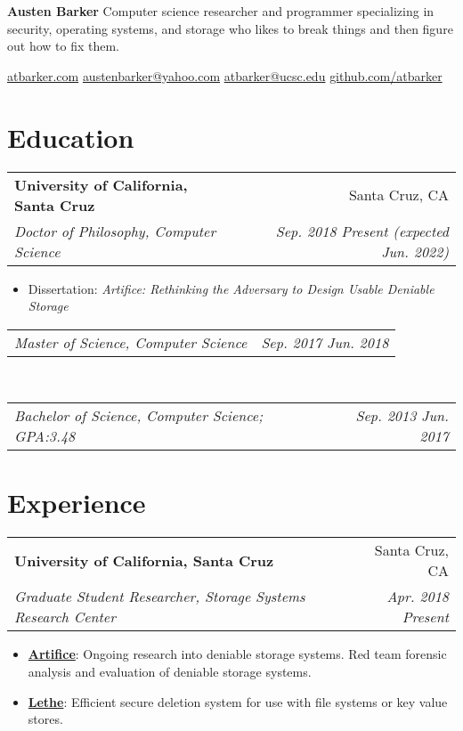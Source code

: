 \documentclass[letterpaper,10pt,oneside]{memoir}
\makeatletter
\newcommand{\resumeItem}[2]{
  \item\small{
    \textbf{#1}{: #2}
  }
}
\newcommand{\resumeSubheading}[4]{
  \vspace{1pt}%
    \begin{tabular*}{0.99\textwidth}[t]{l@{\extracolsep{\fill}}r}
      \textbf{#1} & #2 \\
      \textit{\small #3} & \textit{\small #4} \\
    \end{tabular*}
}
\newcommand{\resumeSubheadingContinue}[2]{
  \vspace{-1pt}
    \begin{tabular*}{0.99\textwidth}[t]{l@{\extracolsep{\fill}}r}
      \textit{\small #1} & \textit{\small #2} \\
    \end{tabular*}
}
\newcommand{\resumeSubHeadingListStart}{\vspace{1pt}\begin{itemize}[noitemsep,nolistsep,leftmargin=*,label={}]}
\newcommand{\resumeSubHeadingListEnd}{\end{itemize}}
\newcommand{\resumeItemListStart}{\begin{itemize}[noitemsep,nolistsep]}
\newcommand{\resumeItemListEnd}{\end{itemize}}
\makeatother
\begin{document}
\begin{minipage}[t]{0.75\textwidth}
\raggedright
    {\fontsize{30pt}{34pt}\selectfont
        \rmfamily\textbf{Austen Barker}}
    \vfill
    Computer science researcher and programmer specializing in security, operating systems, and storage who likes to break things and then figure out how to fix them.
\end{minipage}
\begin{minipage}[t]{0.25\textwidth}
\raggedleft
    \vspace{-20pt}
    \href{https://atbarker.com}{atbarker.com}
    \vfill
    \href{mailto:austenbarker@yahoo.com}{austenbarker@yahoo.com}
    \href{mailto:atbarker@ucsc.edu}{atbarker@ucsc.edu}
    \vfill
    \href{https://www.github.com/atbarker}{github.com/atbarker}
\end{minipage}

\vskip6pt

\section{Education}
    \resumeSubheading
     {University of California, Santa Cruz}{Santa Cruz, CA}
     {Doctor of Philosophy, Computer Science}{Sep. 2018 \textemdash{} Present (expected Jun. 2022)}
     \vspace{-5pt}
      \resumeSubHeadingListStart
	\item \small{Dissertation: \emph{Artifice: Rethinking the Adversary to Design Usable Deniable Storage}}
      \resumeSubHeadingListEnd
     \vspace{-5pt}
    \resumeSubheadingContinue
      {Master of Science, Computer Science}{Sep. 2017 \textemdash{} Jun. 2018}\\
    \resumeSubheadingContinue
      {Bachelor of Science, Computer Science; GPA:\@ 3.48}{Sep. 2013 \textemdash{} Jun. 2017}


\section{Experience}
    \resumeSubheading
      {University of California, Santa Cruz}{Santa Cruz, CA}
      {Graduate Student Researcher, Storage Systems Research Center}{Apr. 2018 \textemdash{} Present}
      \resumeItemListStart
        \resumeItem{\href{https://www.ssrc.ucsc.edu/proj/Artifice.html}{Artifice}}
    	  {Ongoing research into deniable storage systems. Red team forensic analysis and evaluation of deniable storage systems.} 
    	\resumeItem{\href{https://www.ssrc.ucsc.edu/proj/securefs.html}{Lethe}}
    	  {Efficient secure deletion system for use with file systems or key value stores.}
      \resumeItemListEnd
\end{document}

